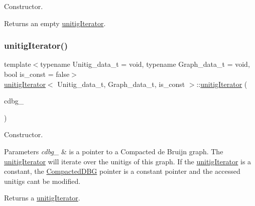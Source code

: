 Constructor. 

\begin{DoxyReturn}{Returns}
an empty \hyperlink{classunitigIterator}{unitig\+Iterator}. 
\end{DoxyReturn}
\mbox{\label{classunitigIterator_a3a1d4af1f86c340ef92197cd11baa80a}} 
\subsubsection{\texorpdfstring{unitig\+Iterator()}{unitigIterator()}\hspace{0.1cm}{\footnotesize\ttfamily [2/3]}}
{\footnotesize\ttfamily template$<$typename Unitig\+\_\+data\+\_\+t  = void, typename Graph\+\_\+data\+\_\+t  = void, bool is\+\_\+const = false$>$ \\
\hyperlink{classunitigIterator}{unitig\+Iterator}$<$ Unitig\+\_\+data\+\_\+t, Graph\+\_\+data\+\_\+t, is\+\_\+const $>$\+::\hyperlink{classunitigIterator}{unitig\+Iterator} (\begin{DoxyParamCaption}\item[{Compacted\+D\+B\+G\+\_\+ptr\+\_\+t}]{cdbg\+\_\+ }\end{DoxyParamCaption})}



Constructor. 


\begin{DoxyParams}{Parameters}
{\em cdbg\+\_\+} & is a pointer to a Compacted de Bruijn graph. The \hyperlink{classunitigIterator}{unitig\+Iterator} will iterate over the unitigs of this graph. If the \hyperlink{classunitigIterator}{unitig\+Iterator} is a constant, the \hyperlink{classCompactedDBG}{Compacted\+D\+BG} pointer is a constant pointer and the accessed unitigs can\textquotesingle{}t be modified. \\
\hline
\end{DoxyParams}
\begin{DoxyReturn}{Returns}
a \hyperlink{classunitigIterator}{unitig\+Iterator}. 
\end{DoxyReturn}
\mbox{\label{classunitigIterator_af9a7540eb106197afa5b3befd7bf3ac9}} 
